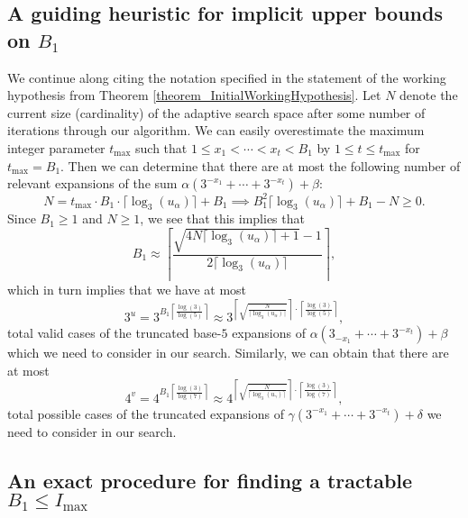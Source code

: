 \documentclass[12pt]{article}
\begin{document}
\subsection{A guiding heuristic for implicit upper bounds on $B_1$} 

We continue along citing the notation specified in the statement of the working hypothesis from 
Theorem \ref{theorem_InitialWorkingHypothesis}. 
Let $N$ denote the current size (cardinality) of the adaptive search space after some number of 
iterations through our algorithm. We can easily overestimate the maximum integer parameter 
$t_{\max}$ such that $1 \leq x_1 < \cdots < x_t < B_1$ by $1 \leq t \leq t_{\max}$ for $t_{\max} = B_1$. 
Then we can determine that there are at most the following number of relevant expansions of the sum 
$\alpha(3^{-x_1}+\cdots+3^{-x_t}) + \beta$: 
\[
N = t_{\max} \cdot B_1 \cdot \lceil \log_3(u_{\alpha}) \rceil + B_1 \implies 
     B_1^2 \lceil \log_3(u_{\alpha}) \rceil + B_1 - N \geq 0. 
\]
Since $B_1 \geq 1$ and $N \geq 1$, we see that this implies that 
\[
B_1 \approx \left\lceil \frac{\sqrt{4N \lceil \log_3(u_{\alpha}) \rceil+1}-1}{ 
     2 \lceil \log_3(u_{\alpha}) \rceil}\right\rceil, 
\]
which in turn implies that we have at most 
\[
3^u = 3^{B_1 \left\lceil \frac{\log(3)}{\log(5)} \right\rceil} \approx 
     3^{\left\lceil \sqrt{\frac{N}{\lceil \log_3(u_{\alpha}) \rceil}} \right\rceil 
     \cdot \left\lceil \frac{\log(3)}{\log(5)} \right\rceil}, 
\]
total valid cases of the truncated base-$5$ expansions of $\alpha(3_{-x_1}+\cdots+3^{-x_t}) + \beta$ 
which we need to consider in our search. 
Similarly, we can obtain that there are at most 
\[
4^v = 4^{B_1 \left\lceil \frac{\log(3)}{\log(7)} \right\rceil} \approx 
     4^{\left\lceil \sqrt{\frac{N}{\lceil \log_3(u_{\gamma}) \rceil}} \right\rceil 
     \cdot \left\lceil \frac{\log(3)}{\log(7)} \right\rceil}, 
\] 
total possible cases of the truncated expansions of 
$\gamma(3^{-x_1}+\cdots+3^{-x_t}) + \delta$ we need to consider in our search. 

\subsection{An exact procedure for finding a tractable $B_1 \leq I_{\max}$} 
\label{SubSection_ArgConvOfB1} 
\end{document}
